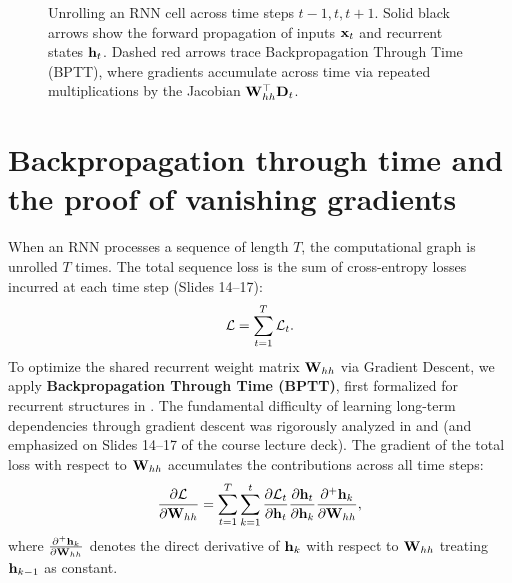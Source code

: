 \documentclass[../../main.tex]{subfiles}
\begin{document}
\begin{figure}[htbp]
{%
}
\caption{Unrolling an RNN cell across time steps $t-1, t, t+1$. Solid black arrows show the forward propagation of inputs $\mathbf{x}_t$ and recurrent states $\mathbf{h}_t$. Dashed red arrows trace Backpropagation Through Time (BPTT), where gradients accumulate across time via repeated multiplications by the Jacobian $\mathbf{W}_{hh}^\top \mathbf{D}_t$.}
\label{fig:unrolled_rnn}
\end{figure}

\section{Backpropagation through time and the proof of vanishing gradients}
\label{sec:bptt_proof}

When an RNN processes a sequence of length $T$, the computational graph is unrolled $T$ times. The total sequence loss is the sum of cross-entropy losses incurred at each time step (Slides 14--17):
\begin{equation}
\label{eq:total_rnn_loss}
\mathcal{L} = \sum_{t=1}^T \mathcal{L}_t.
\end{equation}
To optimize the shared recurrent weight matrix $\mathbf{W}_{hh}$ via Gradient Descent, we apply \textbf{Backpropagation Through Time (BPTT)}, first formalized for recurrent structures in \cite{werbos1990}. The fundamental difficulty of learning long-term dependencies through gradient descent was rigorously analyzed in \cite{bengio1994} and \cite{pascanu2013difficulty} (and emphasized on Slides 14--17 of the course lecture deck). The gradient of the total loss with respect to $\mathbf{W}_{hh}$ accumulates the contributions across all time steps:
\begin{equation}
\label{eq:bptt_grad_whh}
\frac{\partial \mathcal{L}}{\partial \mathbf{W}_{hh}} = \sum_{t=1}^T \sum_{k=1}^t \frac{\partial \mathcal{L}_t}{\partial \mathbf{h}_t} \frac{\partial \mathbf{h}_t}{\partial \mathbf{h}_k} \frac{\partial^+ \mathbf{h}_k}{\partial \mathbf{W}_{hh}},
\end{equation}
where $\frac{\partial^+ \mathbf{h}_k}{\partial \mathbf{W}_{hh}}$ denotes the direct derivative of $\mathbf{h}_k$ with respect to $\mathbf{W}_{hh}$ treating $\mathbf{h}_{k-1}$ as constant.
\end{document}
